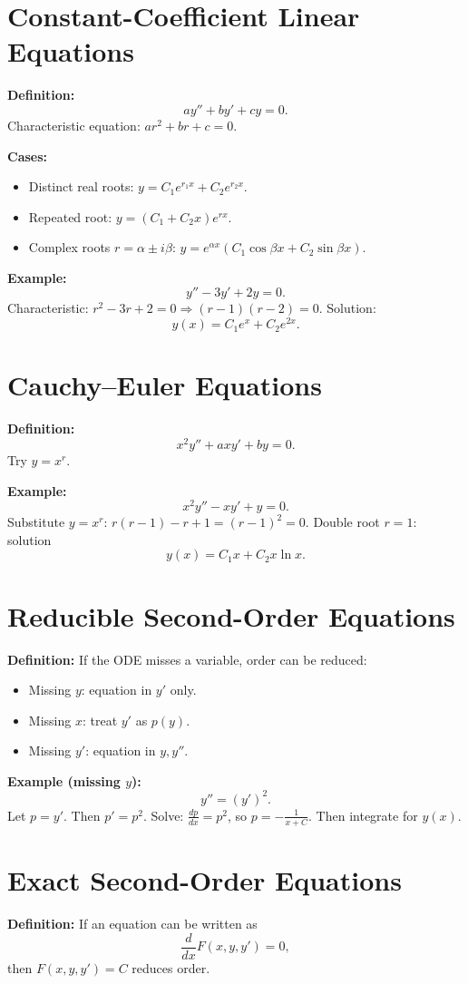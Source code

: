 \documentclass[12pt]{book}
\begin{document}
\chapter{Constant-Coefficient Linear Equations}
\textbf{Definition:}
\[
a y'' + b y' + c y = 0.
\]
Characteristic equation: $a r^2 + b r + c = 0$.

\textbf{Cases:}
\begin{itemize}
  \item Distinct real roots: $y = C_1 e^{r_1 x} + C_2 e^{r_2 x}$.
  \item Repeated root: $y = (C_1 + C_2 x)e^{rx}$.
  \item Complex roots $r=\alpha \pm i\beta$: $y = e^{\alpha x}(C_1\cos \beta x + C_2 \sin \beta x)$.
\end{itemize}

\textbf{Example:}
\[
y'' - 3y' + 2y = 0.
\]
Characteristic: $r^2 - 3r + 2 = 0 \Rightarrow (r-1)(r-2)=0$.  
Solution:
\[
y(x) = C_1 e^x + C_2 e^{2x}.
\]

\chapter{Cauchy--Euler Equations}
\textbf{Definition:}
\[
x^2 y'' + a x y' + b y = 0.
\]
Try $y = x^r$.

\textbf{Example:}
\[
x^2 y'' - x y' + y = 0.
\]
Substitute $y = x^r$: $r(r-1) - r + 1 = (r-1)^2=0$.  
Double root $r=1$: solution
\[
y(x) = C_1 x + C_2 x \ln x.
\]

\chapter{Reducible Second-Order Equations}
\textbf{Definition:} If the ODE misses a variable, order can be reduced:
\begin{itemize}
  \item Missing $y$: equation in $y'$ only.
  \item Missing $x$: treat $y'$ as $p(y)$.
  \item Missing $y'$: equation in $y,y''$.
\end{itemize}

\textbf{Example (missing $y$):}
\[
y'' = (y')^2.
\]
Let $p=y'$. Then $p' = p^2$. Solve: $\tfrac{dp}{dx}=p^2$, so $p = -\frac{1}{x+C}$. Then integrate for $y(x)$.

\chapter{Exact Second-Order Equations}
\textbf{Definition:}
If an equation can be written as
\[
\frac{d}{dx}F(x,y,y')=0,
\]
then $F(x,y,y')=C$ reduces order.
\end{document}
